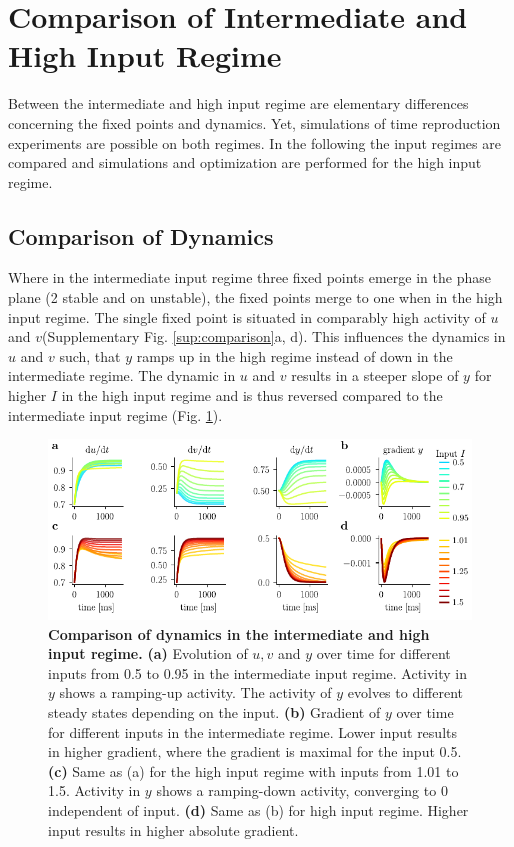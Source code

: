 \documentclass[10pt]{article}
\begin{document}
\section{Comparison of Intermediate and High Input Regime}
Between the intermediate and high input regime are elementary differences concerning the fixed points and dynamics. Yet, simulations of time reproduction experiments are possible on both regimes. In the following the input regimes are compared and simulations and optimization are performed for the high input regime.

\subsection{Comparison of Dynamics}
Where in the intermediate input regime three fixed points emerge in the phase plane (2 stable and on unstable), the fixed points merge to one when in the high input regime. 
The single fixed point is situated in comparably high activity of $u$ and $v$(Supplementary Fig. \ref{sup:comparison}a, d). 
This influences the dynamics in $u$ and $v$ such, that $y$ ramps up in the high regime instead of down in the intermediate regime. 
The dynamic in $u$ and $v$ results in a steeper slope of $y$ for higher $I$ in the high input regime and is thus reversed compared to the intermediate input regime (Fig. \ref{regimes}). 

\begin{figure}[ht]
	\centering
	\includegraphics{figures/supp_regimes.pdf}
	\caption{\textbf{Comparison of dynamics in the intermediate and high input regime.} 
	\textbf{(a)} Evolution of $u, v$ and $y$ over time for different inputs from 0.5 to 0.95 in the intermediate input regime. Activity in $y$ shows a ramping-up activity. The activity of $y$ evolves to different steady states depending on the input. 
	\textbf{(b)} Gradient of $y$ over time for different inputs in the intermediate regime. Lower input results in higher gradient, where the gradient is maximal for the input 0.5.
	\textbf{(c)} Same as (a) for the high input regime with inputs from 1.01 to 1.5. Activity in $y$ shows a ramping-down activity, converging to 0 independent of input.
	\textbf{(d)} Same as (b) for high input regime. Higher input results in higher absolute gradient. 
	}
\label{regimes}
\end{figure}
\end{document}
